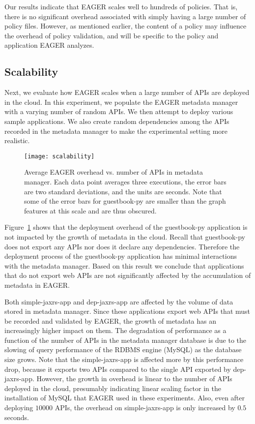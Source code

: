 Our results indicate that EAGER scales well to hundreds of policies. That is,
there is no significant overhead associated with simply having a large number
of policy files. However, as mentioned earlier, the content of a policy may
influence the overhead of policy validation, and will be specific to the policy and 
application EAGER analyzes.
 
\subsection{Scalability}
Next, we evaluate how EAGER scales when a large number of APIs are deployed 
in the cloud. In this experiment, we populate the EAGER
metadata manager with a varying number of random APIs. We then attempt to deploy various sample 
applications. We also create random dependencies among the APIs recorded in the 
metadata manager to make the experimental setting more realistic.

\begin{figure}
\centering
\texttt{[image: scalability]}
\caption{Average EAGER overhead vs. number of APIs in metadata manager.  Each
data point averages three executions, the error bars are two standard
deviations, and the units are seconds.  Note that some of the error bars for
guestbook-py are smaller than the graph features at this scale and are thus obscured.}
\label{fig:scalability}
\end{figure}

Figure~\ref{fig:scalability} shows that the deployment overhead of the 
guestbook-py application is not impacted by the growth of metadata
in the cloud. Recall that guestbook-py does not export any APIs nor does it 
declare any dependencies. Therefore the deployment process of
the guestbook-py application has minimal interactions with the 
metadata manager. Based on this result we conclude that applications that
do not export web APIs are not significantly affected by the accumulation 
of metadata in EAGER.

Both simple-jaxrs-app and dep-jaxrs-app are
affected by the volume of data stored in metadata manager. Since these applications 
export web APIs that must be recorded and validated by EAGER, 
the growth of metadata has an increasingly higher impact on them. 
The degradation 
of performance as a function of the number of APIs in the metadata manager
database is due to the slowing of query performance of the RDBMS engine (MySQL) 
as the database size grows. Note that the simple-jaxrs-app
is affected more by this performance drop, because it exports two APIs compared to the single API exported 
by dep-jaxrs-app. However, the growth
in overhead is linear to the number of APIs deployed in the cloud, presumably
indicating linear scaling factor in the installation of MySQL that EAGER used
in these experiments. Also,
even after deploying $10000$ APIs, the overhead on simple-jaxrs-app is only increased by 
$0.5$ seconds.

